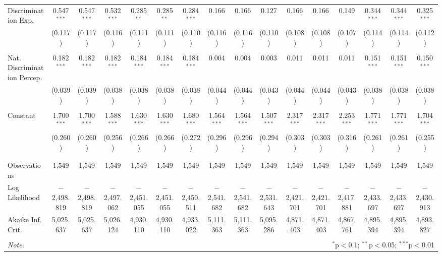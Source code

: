 \begin{table}[!htbp]
\begin{tabular}{@{\extracolsep{5pt}}lccccccccccccccc}
 Discrimination Exp. & 0.547$^{***}$ & 0.547$^{***}$ & 0.532$^{***}$ & 0.285$^{**}$ & 0.285$^{**}$ & 0.284$^{***}$ & 0.166 & 0.166 & 0.127 & 0.166 & 0.166 & 0.149 & 0.344$^{***}$ & 0.344$^{***}$ & 0.325$^{***}$ \\ 
  & (0.117) & (0.117) & (0.116) & (0.111) & (0.111) & (0.110) & (0.116) & (0.116) & (0.110) & (0.108) & (0.108) & (0.107) & (0.114) & (0.114) & (0.112) \\ 
  & & & & & & & & & & & & & & & \\ 
 Nat. Discrimination Percep. & 0.182$^{***}$ & 0.182$^{***}$ & 0.182$^{***}$ & 0.184$^{***}$ & 0.184$^{***}$ & 0.184$^{***}$ & 0.004 & 0.004 & 0.003 & 0.011 & 0.011 & 0.011 & 0.151$^{***}$ & 0.151$^{***}$ & 0.150$^{***}$ \\ 
  & (0.039) & (0.039) & (0.038) & (0.038) & (0.038) & (0.038) & (0.044) & (0.044) & (0.043) & (0.044) & (0.044) & (0.043) & (0.038) & (0.038) & (0.038) \\ 
  & & & & & & & & & & & & & & & \\ 
 Constant & 1.700$^{***}$ & 1.700$^{***}$ & 1.588$^{***}$ & 1.630$^{***}$ & 1.630$^{***}$ & 1.680$^{***}$ & 1.564$^{***}$ & 1.564$^{***}$ & 1.507$^{***}$ & 2.317$^{***}$ & 2.317$^{***}$ & 2.253$^{***}$ & 1.771$^{***}$ & 1.771$^{***}$ & 1.704$^{***}$ \\ 
  & (0.260) & (0.260) & (0.256) & (0.266) & (0.266) & (0.272) & (0.296) & (0.296) & (0.294) & (0.303) & (0.303) & (0.316) & (0.261) & (0.261) & (0.255) \\ 
  & & & & & & & & & & & & & & & \\ 
\hline \\[-1.8ex] 
Observations & 1,549 & 1,549 & 1,549 & 1,549 & 1,549 & 1,549 & 1,549 & 1,549 & 1,549 & 1,549 & 1,549 & 1,549 & 1,549 & 1,549 & 1,549 \\ 
Log Likelihood & $-$2,498.819 & $-$2,498.819 & $-$2,497.062 & $-$2,451.055 & $-$2,451.055 & $-$2,450.511 & $-$2,541.682 & $-$2,541.682 & $-$2,531.643 & $-$2,421.701 & $-$2,421.701 & $-$2,417.881 & $-$2,433.697 & $-$2,433.697 & $-$2,430.913 \\ 
Akaike Inf. Crit. & 5,025.637 & 5,025.637 & 5,026.124 & 4,930.110 & 4,930.110 & 4,933.022 & 5,111.363 & 5,111.363 & 5,095.286 & 4,871.403 & 4,871.403 & 4,867.761 & 4,895.394 & 4,895.394 & 4,893.827 \\ 
\hline 
\hline \\[-1.8ex] 
\textit{Note:}  & \multicolumn{15}{r}{$^{*}$p$<$0.1; $^{**}$p$<$0.05; $^{***}$p$<$0.01} \\ 
\end{tabular} 
\end{table} 
